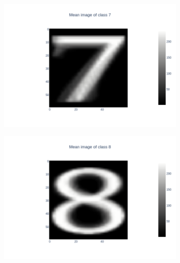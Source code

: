 \documentclass{article}
\begin{document}
\begin{figure}[h]
\begin{subfigure}{.3\linewidth}
    \end{subfigure}
    \hfill
    \begin{subfigure}{.3\linewidth}
        \centering
        \includegraphics[width=\linewidth]{images/q2/partd/7_prototype.png}
    \end{subfigure}
    \hfill
    \begin{subfigure}{.3\linewidth}
        \centering
        \includegraphics[width=\linewidth]{images/q2/partd/8_prototype.png}
    \end{subfigure}
    \newline
    \hfill
    \begin{subfigure}{.3\linewidth}
        \centering

\end{subfigure}
\end{figure}
\end{document}
